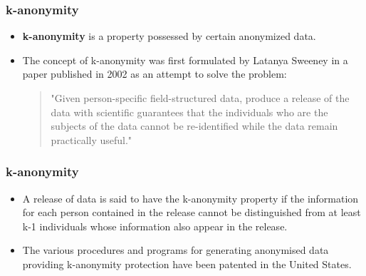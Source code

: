 \documentclass[SDCmaster.tex]{subfiles}
\begin{document}
	\begin{frame}
\frametitle{k-anonymity}
\begin{itemize}
\item \textbf{k-anonymity} is a property possessed by certain anonymized data. 
\item The concept of k-anonymity was first formulated by Latanya Sweeney in a paper published in 2002 as an attempt to solve the problem: 
\begin{quote}"Given person-specific field-structured data, produce a release of the data with scientific guarantees that the individuals who are the subjects of the data cannot be re-identified while the data remain practically useful."
\end{quote}
\end{itemize}
\end{frame}
	\begin{frame}
		\frametitle{k-anonymity}
		\begin{itemize}
\item A release of data is said to have the k-anonymity property if the information for each person contained in the release cannot be distinguished from at least k-1 individuals whose information also appear in the release. 
\item The various procedures and programs for generating anonymised data providing k-anonymity protection have been patented in the United States.
\end{itemize}
\end{frame}
\end{document}
